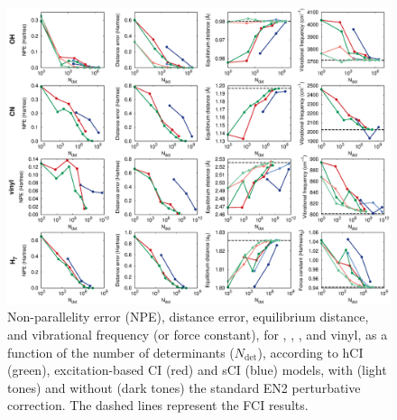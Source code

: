 \documentclass[aip,jcp,reprint,noshowkeys,superscriptaddress]{revtex4-1}
\newcommand{\Ndet}{N_\text{det}}
\begin{document}
\begin{figure}%
\includegraphics[width=1.0\linewidth]{plot_all}
\caption{
Non-parallelity error (NPE), distance error, equilibrium distance, and vibrational frequency (or force constant), for , , , and vinyl,
as a function of the number of determinants ($\Ndet$), according to hCI (green), excitation-based CI (red) and sCI (blue) models,
with (light tones) and without (dark tones) the standard EN2 perturbative correction.
The dashed lines represent the FCI results.}
\label{fig:plot_all}
\end{figure}
\end{document}
